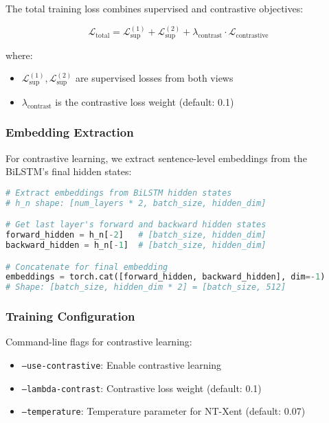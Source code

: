\documentclass[12pt,a4paper]{article}
\begin{document}
The total training loss combines supervised and contrastive objectives:

\begin{equation}
\mathcal{L}_{\text{total}} = \mathcal{L}_{\text{sup}}^{(1)} + \mathcal{L}_{\text{sup}}^{(2)} + \lambda_{\text{contrast}} \cdot \mathcal{L}_{\text{contrastive}}
\end{equation}

where:
\begin{itemize}
    \item $\mathcal{L}_{\text{sup}}^{(1)}, \mathcal{L}_{\text{sup}}^{(2)}$ are supervised losses from both views
    \item $\lambda_{\text{contrast}}$ is the contrastive loss weight (default: 0.1)
\end{itemize}

\subsubsection{Embedding Extraction}

For contrastive learning, we extract sentence-level embeddings from the BiLSTM's final hidden states:

\begin{lstlisting}[language=Python, caption={Embedding Extraction for Contrastive Learning}]
# Extract embeddings from BiLSTM hidden states
# h_n shape: [num_layers * 2, batch_size, hidden_dim]

# Get last layer's forward and backward hidden states
forward_hidden = h_n[-2]   # [batch_size, hidden_dim]
backward_hidden = h_n[-1]  # [batch_size, hidden_dim]

# Concatenate for final embedding
embeddings = torch.cat([forward_hidden, backward_hidden], dim=-1)
# Shape: [batch_size, hidden_dim * 2] = [batch_size, 512]
\end{lstlisting}

\subsubsection{Training Configuration}

Command-line flags for contrastive learning:
\begin{itemize}
    \item \texttt{--use-contrastive}: Enable contrastive learning
    \item \texttt{--lambda-contrast}: Contrastive loss weight (default: 0.1)
    \item \texttt{--temperature}: Temperature parameter for NT-Xent (default: 0.07)
\end{itemize}
\end{document}
